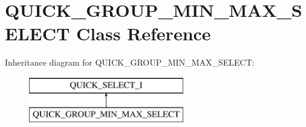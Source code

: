 \hypertarget{classQUICK__GROUP__MIN__MAX__SELECT}{}\section{Q\+U\+I\+C\+K\+\_\+\+G\+R\+O\+U\+P\+\_\+\+M\+I\+N\+\_\+\+M\+A\+X\+\_\+\+S\+E\+L\+E\+CT Class Reference}
\label{classQUICK__GROUP__MIN__MAX__SELECT}
Inheritance diagram for Q\+U\+I\+C\+K\+\_\+\+G\+R\+O\+U\+P\+\_\+\+M\+I\+N\+\_\+\+M\+A\+X\+\_\+\+S\+E\+L\+E\+CT\+:\begin{figure}[H]
\begin{center}
\leavevmode
\includegraphics[height=2.000000cm]{classQUICK__GROUP__MIN__MAX__SELECT}
\end{center}
\end{figure}
